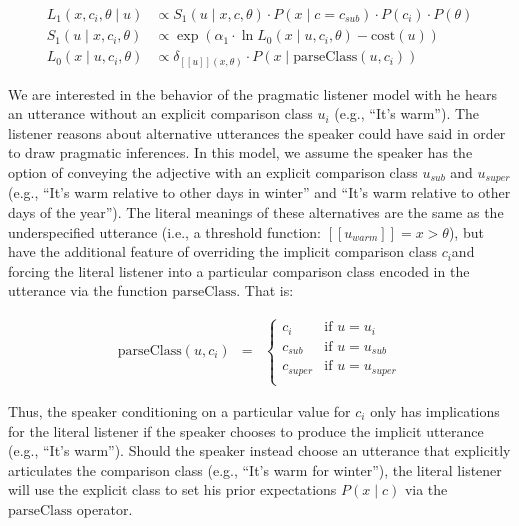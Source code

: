 \documentclass[doc]{apa6}
\begin{document}
\begin{align}
L_{1}(x, c_{i}, \theta \mid u) &\propto S_{1}(u \mid x, c, \theta) \cdot P(x \mid c =  c_{sub}) \cdot P(c_{i}) \cdot P(\theta) \label{eq:L1a}\\
S_{1}(u \mid x, c_i, \theta) &\propto \exp{(\alpha_1 \cdot \ln {L_{0}(x \mid u, c_i, \theta)}- \text{cost}(u)) } \label{eq:S1a}\\
L_{0}(x \mid u, c_i, \theta) &\propto {\delta_{[\![u]\!](x, \theta)} \cdot P(x \mid \text{parseClass}(u, c_i))} \label{eq:L0a}
\end{align}

We are interested in the behavior of the pragmatic listener model with
he hears an utterance without an explicit comparison class \(u_{i}\)
(e.g., ``It's warm''). The listener reasons about alternative
utterances the speaker could have said in order to draw pragmatic
inferences. In this model, we assume the speaker has the option of
conveying the adjective with an explicit comparison class \(u_{sub}\)
and \(u_{super}\) (e.g., ``It's warm relative to other days in
winter'' and ``It's warm relative to other days of the year'').
The literal meanings of these alternatives are the same as the
underspecified utterance (i.e., a threshold function:
\([\![u_{warm}]\!] = x > \theta\)), but have the additional feature of
overriding the implicit comparison class \(c_i\)and forcing the literal
listener into a particular comparison class encoded in the utterance via
the function \(\text{parseClass}\). That is:

\begin{eqnarray}
\text{parseClass}(u, c_i) & = &
\begin{cases}
c_{i} & \text{if } u = u_{i}\\
c_{sub} & \text{if } u = u_{sub}\\
c_{super} & \text{if } u = u_{super}\\
\end{cases}
\end{eqnarray}

Thus, the speaker conditioning on a particular value for \(c_{i}\) only
has implications for the literal listener if the speaker chooses to
produce the implicit utterance (e.g., ``It's warm''). Should the
speaker instead choose an utterance that explicitly articulates the
comparison class (e.g., ``It's warm for winter''), the literal
listener will use the explicit class to set his prior expectations
\(P(x \mid c)\) via the \(\text{parseClass}\) operator.
\end{document}

